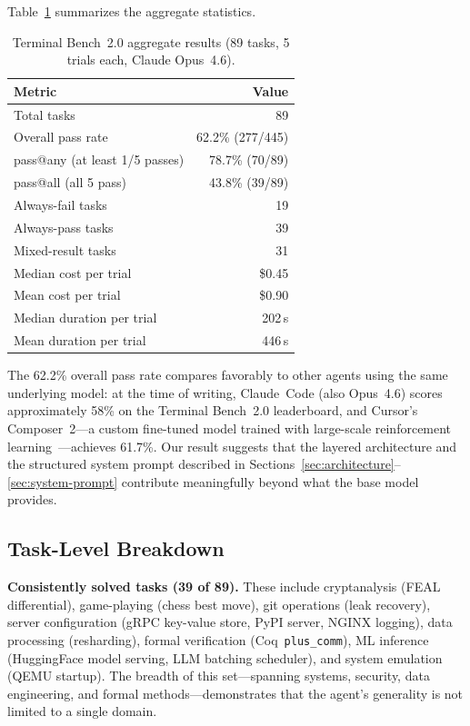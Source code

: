 \documentclass{article}
\begin{document}
Table~\ref{tab:tb2-aggregate} summarizes the aggregate statistics.

\begin{table}[h]
\centering
\caption{Terminal Bench~2.0 aggregate results (89 tasks, 5 trials each, Claude Opus~4.6).}
\label{tab:tb2-aggregate}
\begin{tabular}{lr}
\toprule
\textbf{Metric} & \textbf{Value} \\
\midrule
Total tasks              & 89 \\
Overall pass rate        & 62.2\% (277/445) \\
pass@any (at least 1/5 passes) & 78.7\% (70/89) \\
pass@all (all 5 pass)    & 43.8\% (39/89) \\
Always-fail tasks        & 19 \\
Always-pass tasks        & 39 \\
Mixed-result tasks       & 31 \\
Median cost per trial    & \$0.45 \\
Mean cost per trial      & \$0.90 \\
Median duration per trial & 202\,s \\
Mean duration per trial  & 446\,s \\
\bottomrule
\end{tabular}
\end{table}

The 62.2\% overall pass rate compares favorably to other agents using the same underlying model: at the time of writing, Claude~Code (also Opus~4.6) scores approximately 58\% on the Terminal Bench~2.0 leaderboard, and Cursor's Composer~2---a custom fine-tuned model trained with large-scale reinforcement learning~\citep{cursor2026composer2}---achieves 61.7\%.  Our result suggests that the layered architecture and the structured system prompt described in Sections~\ref{sec:architecture}--\ref{sec:system-prompt} contribute meaningfully beyond what the base model provides.

\subsection{Task-Level Breakdown}

\textbf{Consistently solved tasks (39 of 89).} These include cryptanalysis (FEAL differential), game-playing (chess best move), git operations (leak recovery), server configuration (gRPC key-value store, PyPI server, NGINX logging), data processing (resharding), formal verification (Coq~\texttt{plus\_comm}), ML inference (HuggingFace model serving, LLM batching scheduler), and system emulation (QEMU startup).  The breadth of this set---spanning systems, security, data engineering, and formal methods---demonstrates that the agent's generality is not limited to a single domain.
\end{document}
